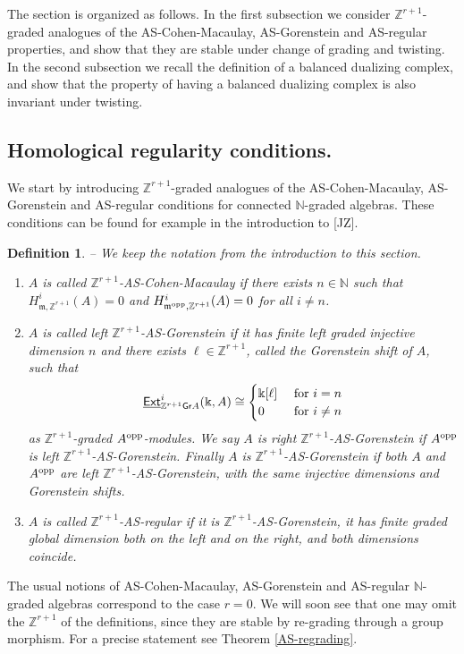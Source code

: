 \documentclass[twoside,11pt]{article}
\renewcommand{\k}{\Bbbk}
\newcommand{\N}{{\mathbb N}}
\newcommand{\Z}{{\mathbb Z}}
\newcommand{\m}{{\mathfrak m}}
\newcommand{\GrMod}{{\sf Gr}}
\newcommand{\EXT}{\underline{\sf Ext}}
\newcommand{\opp}{{\rm opp}}
\newtheorem{subdefinition}[subtheorem]{Definition}
\begin{document}
The section is organized as follows. In the first subsection we consider $\Z^{r+1}$-graded
analogues of the AS-Cohen-Macaulay, AS-Gorenstein and AS-regular properties, and show that
they are stable under change of grading and twisting. In the second subsection we recall
the definition of a balanced dualizing complex, and show that the property of having a
balanced dualizing complex is also invariant under twisting.


\subsection{Homological regularity conditions.} \label{hrc}
We start by introducing $\Z^{r+1}$-graded analogues of the AS-Cohen-Macaulay,
AS-Gorenstein and AS-regular conditions for connected $\N$-graded algebras. These
conditions can be found for example in the introduction to [JZ].
\begin{subdefinition} -- \label{def-reg-cond}
We keep the notation from the introduction to this section.
\begin{enumerate}
\item $A$ is called \emph{$\Z^{r+1}$-AS-Cohen-Macaulay} if there exists $n \in \N$
such that $H^i_{\m, \Z^{r+1}}(A) = 0$ and $H_{\m^\opp, \Z^{r+1}}^i(A) = 0$ for all $i \neq
n$.
\item $A$ is called \emph{left $\Z^{r+1}$-AS-Gorenstein} if it has finite left graded
injective dimension $n$ and there exists $\ell \in \Z^{r+1}$, called the \emph{Gorenstein
shift} of $A$, such that
\[
\EXT_{\Z^{r+1}\GrMod A}^i(\k,A) \cong 
\begin{cases} \k[\ell] & \mbox{ for } i = n \\ 0 & \mbox{ for } i \neq n\end{cases}
\]
as $\Z^{r+1}$-graded $A^\opp$-modules. We say $A$ is \emph{right} $\Z^{r+1}$-AS-Gorenstein
if $A^\opp$ is left $\Z^{r+1}$-AS-Gorenstein. Finally $A$ is
\emph{$\Z^{r+1}$-AS-Gorenstein} if both $A$ and $A^\opp$ are left
$\Z^{r+1}$-AS-Gorenstein,
with the same injective dimensions and Gorenstein shifts.

\item $A$ is called \emph{$\Z^{r+1}$-AS-regular} if it is
$\Z^{r+1}$-AS-Gorenstein, it has finite graded global dimension both on the left and on
the right, and both dimensions coincide.
\end{enumerate}
\end{subdefinition}
The usual notions of AS-Cohen-Macaulay, AS-Gorenstein and AS-regular $\N$-graded algebras
correspond to the case $r = 0$.
We will soon see that one may omit the $\Z^{r+1}$ of the definitions, since they are
stable by re-grading through a group morphism. For a precise statement see Theorem
\ref{AS-regrading}.
\end{document}
